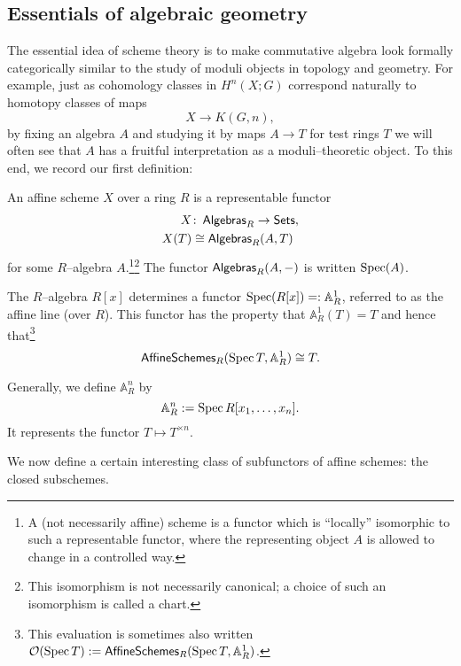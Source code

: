\subsection{Essentials of algebraic geometry}

The essential idea of scheme theory is to make commutative algebra look formally categorically similar to the study of moduli objects in topology and geometry.  For example, just as cohomology classes in $H^n(X; G)$ correspond naturally to homotopy classes of maps \[X \to K(G, n),\] by fixing an algebra $A$ and studying it by maps $A \to T$ for test rings $T$ we will often see that $A$ has a fruitful interpretation as a moduli--theoretic object.  To this end, we record our first definition:

\begin{definition}\label{AffineScheme}
An affine scheme $X$ over a ring $R$ is a representable functor
\begin{align*}
X & \colon\thinspace \mathsf{Algebras}_R \to \mathsf{Sets}, \\
X(T) & \cong \mathsf{Algebras}_R(A, T)
\end{align*}
for some $R$--algebra $A$.\footnote{A (not necessarily affine) scheme is a functor which is ``locally'' isomorphic to such a representable functor, where the representing object $A$ is allowed to change in a controlled way.}\footnote{This isomorphism is not necessarily canonical; a choice of such an isomorphism is called a chart.}  The functor $\mathsf{Algebras}_R(A, -)$ is written $\operatorname{Spec}(A)$.
\end{definition}

\begin{example}\label{A1Example}
The $R$--algebra $R[x]$ determines a functor $\operatorname{Spec}(R[x]) =: \mathbb A^1_R$, referred to as the affine line (over $R$).  This functor has the property that $\mathbb A^1_R(T) = T$ and hence that\footnote{This evaluation is sometimes also written $\mathcal{O}(\operatorname{Spec} T) := \mathsf{AffineSchemes}_R(\operatorname{Spec} T, \mathbb A^1_R)$.} \[\mathsf{AffineSchemes}_R(\operatorname{Spec} T, \mathbb A^1_R) \cong T.\]
\end{example}

\begin{example}
Generally, we define $\mathbb A^n_R$ by \[\mathbb A^n_R := \operatorname{Spec} R[x_1, \ldots, x_n].\]  It represents the functor $T \mapsto T^{\times n}$.
\end{example}

We now define a certain interesting class of subfunctors of affine schemes: the closed subschemes.

